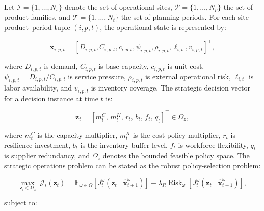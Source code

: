 \documentclass[apajournal,article,submit,pdftex,moreauthors]{Definitions/mdpi}
\begin{document}
Let $\mathcal{I}=\{1,\ldots,N_s\}$ denote the set of operational sites, $\mathcal{P}=\{1,\ldots,N_p\}$ the set of product families, and $\mathcal{T}=\{1,\ldots,N_t\}$ the set of planning periods. For each site--product--period tuple $(i,p,t)$, the operational state is represented by:

\begin{linenomath}
\begin{equation}
\mathbf{x}_{i,p,t}
=
\left[
D_{i,p,t},
C_{i,p,t},
c_{i,p,t},
\psi_{i,p,t},
\rho_{i,p,t},
\ell_{i,t},
v_{i,p,t}
\right]^{\top},
\label{eq:operations_state}
\end{equation}
\end{linenomath}
where $D_{i,p,t}$ is demand, $C_{i,p,t}$ is base capacity, $c_{i,p,t}$ is unit cost, $\psi_{i,p,t}=D_{i,p,t}/C_{i,p,t}$ is service pressure, $\rho_{i,p,t}$ is external operational risk, $\ell_{i,t}$ is labor availability, and $v_{i,p,t}$ is inventory coverage. The strategic decision vector for a decision instance at time $t$ is:

\begin{linenomath}
\begin{equation}
\mathbf{z}_{t}
=
\left[
m^C_t,\,
m^K_t,\,
r_t,\,
b_t,\,
f_t,\,
q_t
\right]^{\top}
\in \Omega_z,
\label{eq:strategic_problem_decision}
\end{equation}
\end{linenomath}
where $m^C_t$ is the capacity multiplier, $m^K_t$ is the cost-policy multiplier, $r_t$ is resilience investment, $b_t$ is the inventory-buffer level, $f_t$ is workforce flexibility, $q_t$ is supplier redundancy, and $\Omega_z$ denotes the bounded feasible policy space. The strategic operations problem can be stated as the robust policy-selection problem:

\begin{linenomath}
\begin{equation}
\max_{\mathbf{z}_t\in\Omega_z}
\;
\mathcal{J}_{t}(\mathbf{z}_t)
=
\mathbb{E}_{\omega\in\Omega}
\left[
J_t^{\omega}(\mathbf{z}_t \mid \widehat{\mathbf{x}}_{t+1}^{\omega})
\right]
-
\lambda_R
\operatorname{Risk}_{\omega}
\left[
J_t^{\omega}(\mathbf{z}_t \mid \widehat{\mathbf{x}}_{t+1}^{\omega})
\right],
\label{eq:strategic_problem_objective}
\end{equation}
\end{linenomath}
subject to:
\end{document}
